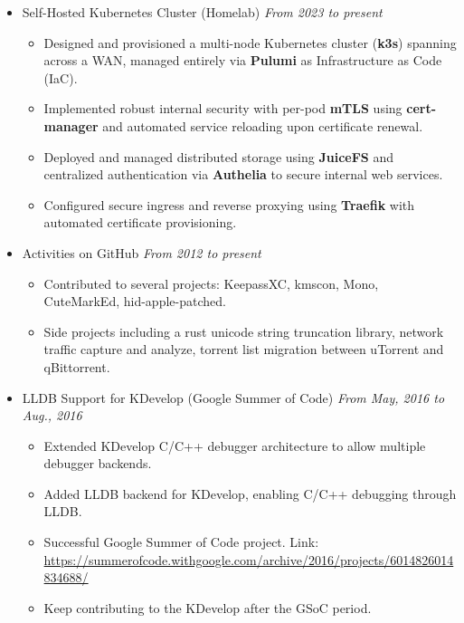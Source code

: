 \documentclass[letterpaper,11pt]{article}
\begin{document}
\begin{itemize}
    \item Self-Hosted Kubernetes Cluster (Homelab) \hfill \textit{From 2023 to present}
    \begin{itemize}
        \item Designed and provisioned a multi-node Kubernetes cluster (\textbf{k3s}) spanning across a WAN, managed entirely via \textbf{Pulumi} as Infrastructure as Code (IaC).
        \item Implemented robust internal security with per-pod \textbf{mTLS} using \textbf{cert-manager} and automated service reloading upon certificate renewal.
        \item Deployed and managed distributed storage using \textbf{JuiceFS} and centralized authentication via \textbf{Authelia} to secure internal web services.
        \item Configured secure ingress and reverse proxying using \textbf{Traefik} with automated certificate provisioning.
    \end{itemize}

    \item Activities on GitHub \hfill \textit{From 2012 to present}
    \begin{itemize}
        \item Contributed to several projects: KeepassXC, kmscon, Mono, CuteMarkEd, hid-apple-patched.
        \item Side projects including a rust unicode string truncation library, network traffic capture and analyze, torrent list migration between uTorrent and qBittorrent.
    \end{itemize}

    \item LLDB Support for KDevelop (Google Summer of Code) \hfill \textit{From May, 2016 to Aug., 2016}
    \begin{itemize}
        \item Extended KDevelop C/C++ debugger architecture to allow multiple debugger backends.
        \item Added LLDB backend for KDevelop, enabling C/C++ debugging through LLDB.
        \item Successful Google Summer of Code project. Link: \url{https://summerofcode.withgoogle.com/archive/2016/projects/6014826014834688/}
        \item Keep contributing to the KDevelop after the GSoC period.
    \end{itemize}


\end{itemize}
\end{document}
